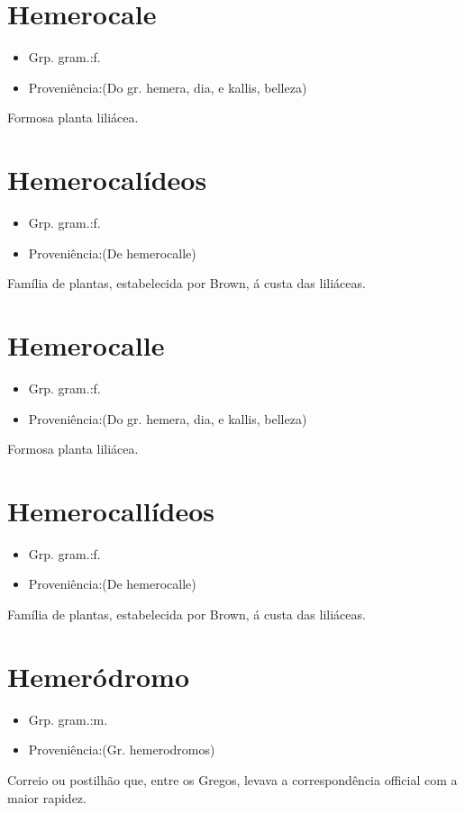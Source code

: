 \documentclass{article}
\begin{document}
\section{Hemerocale}
\begin{itemize}
\item {Grp. gram.:f.}
\end{itemize}
\begin{itemize}
\item {Proveniência:(Do gr. \textunderscore hemera\textunderscore , dia, e \textunderscore kallis\textunderscore , belleza)}
\end{itemize}
Formosa planta liliácea.
\section{Hemerocalídeos}
\begin{itemize}
\item {Grp. gram.:f.}
\end{itemize}
\begin{itemize}
\item {Proveniência:(De \textunderscore hemerocalle\textunderscore )}
\end{itemize}
Família de plantas, estabelecida por Brown, á custa das liliáceas.
\section{Hemerocalle}
\begin{itemize}
\item {Grp. gram.:f.}
\end{itemize}
\begin{itemize}
\item {Proveniência:(Do gr. \textunderscore hemera\textunderscore , dia, e \textunderscore kallis\textunderscore , belleza)}
\end{itemize}
Formosa planta liliácea.
\section{Hemerocallídeos}
\begin{itemize}
\item {Grp. gram.:f.}
\end{itemize}
\begin{itemize}
\item {Proveniência:(De \textunderscore hemerocalle\textunderscore )}
\end{itemize}
Família de plantas, estabelecida por Brown, á custa das liliáceas.
\section{Hemeródromo}
\begin{itemize}
\item {Grp. gram.:m.}
\end{itemize}
\begin{itemize}
\item {Proveniência:(Gr. \textunderscore hemerodromos\textunderscore )}
\end{itemize}
Correio ou postilhão que, entre os Gregos, levava a correspondência official com a maior rapidez.
\end{document}
